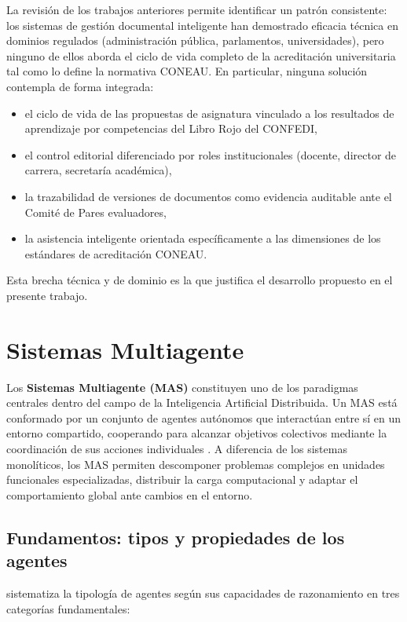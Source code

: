 La revisión de los trabajos anteriores permite identificar un patrón consistente: los sistemas de gestión documental inteligente han demostrado eficacia técnica en dominios regulados (administración pública, parlamentos, universidades), pero ninguno de ellos aborda el ciclo de vida completo de la acreditación universitaria tal como lo define la normativa CONEAU. En particular, ninguna solución contempla de forma integrada:
\begin{itemize}
    \item el ciclo de vida de las propuestas de asignatura vinculado a los resultados de aprendizaje por competencias del Libro Rojo del CONFEDI,
    \item el control editorial diferenciado por roles institucionales (docente, director de carrera, secretaría académica),
    \item la trazabilidad de versiones de documentos como evidencia auditable ante el Comité de Pares evaluadores,
    \item la asistencia inteligente orientada específicamente a las dimensiones de los estándares de acreditación CONEAU.
\end{itemize}
Esta brecha técnica y de dominio es la que justifica el desarrollo propuesto en el presente trabajo.

\section{Sistemas Multiagente}
\label{sec:eda_mas}

Los \textbf{Sistemas Multiagente (MAS)} constituyen uno de los paradigmas centrales dentro del campo de la Inteligencia Artificial Distribuida. Un MAS está conformado por un conjunto de agentes autónomos que interactúan entre sí en un entorno compartido, cooperando para alcanzar objetivos colectivos mediante la coordinación de sus acciones individuales \citep{perez2022breve}. A diferencia de los sistemas monolíticos, los MAS permiten descomponer problemas complejos en unidades funcionales especializadas, distribuir la carga computacional y adaptar el comportamiento global ante cambios en el entorno.

\subsection{Fundamentos: tipos y propiedades de los agentes}

\citet{perez2022breve} sistematiza la tipología de agentes según sus capacidades de razonamiento en tres categorías fundamentales:

